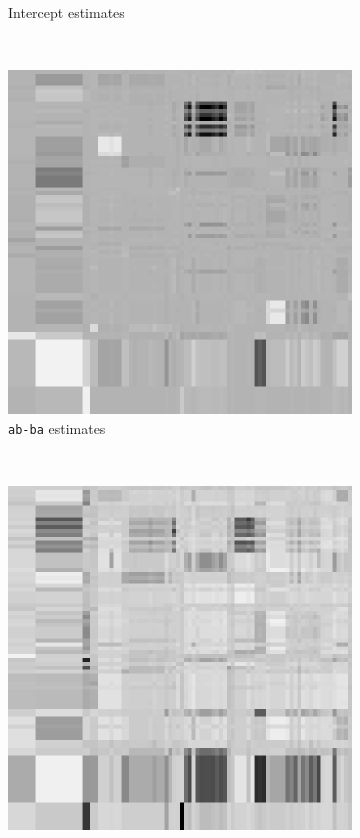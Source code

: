 \begin{figure}[t]
\begin{subfigure}[b]{0.22\textwidth}
\caption{Intercept estimates}
\end{subfigure}
~
\begin{subfigure}[b]{0.22\textwidth}
\centering
\includegraphics[scale=.25]{../figs/eckmann-small/parmat/2}
\caption{\texttt{ab-ba} estimates}
\end{subfigure}
~
\begin{subfigure}[b]{0.22\textwidth}
\centering
\includegraphics[scale=.25]{../figs/eckmann-small/parmat/3}

\end{subfigure}
\end{figure}
